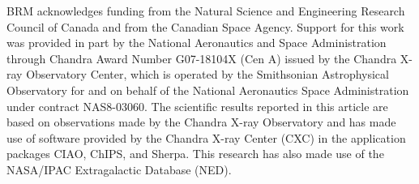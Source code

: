 \documentclass[apjl]{emulateapj}
\begin{document}
\acknowledgements
BRM acknowledges funding from the Natural Science and Engineering Research Council of Canada and from the Canadian Space Agency. Support for this work was provided in part by the National Aeronautics and Space Administration through Chandra Award Number G07-18104X (Cen A) issued by the Chandra X-ray Observatory Center, which is operated by the Smithsonian Astrophysical Observatory for and on behalf of the National Aeronautics Space Administration under contract NAS8-03060. The scientific results reported in this article are based on observations made by the Chandra X-ray Observatory and has made use of software provided by the Chandra X-ray Center (CXC) in the application packages CIAO, ChIPS, and Sherpa. This research has also made use of the NASA/IPAC Extragalactic Database (NED).\\



\end{document}
